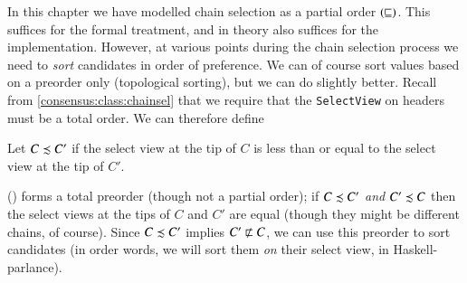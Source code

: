 In this chapter we have modelled chain selection as a partial order
$(\mathrel{\sqsubseteq})$. This suffices for the formal treatment, and in theory also
suffices for the implementation. However, at various points during the chain
selection process we need to \emph{sort} candidates in order of preference. We
can of course sort values based on a preorder only (topological sorting), but we
can do slightly better. Recall from \cref{consensus:class:chainsel} that we
require that the \lstinline!SelectView! on headers must be a total order. We can
therefore define

\begin{definition}
Let $C \precsim C'$ if the select view at the tip of $C$ is less than
or equal to the select view at the tip of $C'$.
\end{definition}

(\selectviewle) forms a total preorder (though not a partial order); if $C
\precsim C'$ \emph{and} $C' \precsim C$ then the select views at the
tips of $C$ and $C'$ are equal (though they might be different chains, of
course). Since $C \precsim C'$ implies $C' \chainnotlt C$, we can use this
preorder  to sort candidates (in order words, we will sort them \emph{on} their
select view, in Haskell-parlance).
